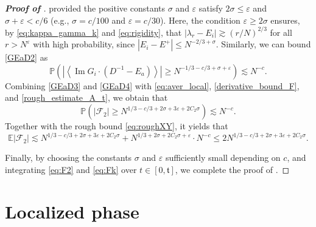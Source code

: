 \documentclass[10pt,reqno]{amsart}
\numberwithin{equation}{section}
\numberwithin{figure}{section}
\theoremstyle{plain} %
\theoremstyle{definition} %
\renewcommand{\P}{\mathbb{P}}
\newcommand{\E}{\mathbb{E}}
\newcommand{\fc}{\mathfrak c}
\newcommand{\ft}{{\mathfrak t}}
\newcommand{\pa}[1]{\left({#1}\right)}
\newcommand{\qa}[1]{\left[{#1}\right]}
\newcommand{\absa}[1]{\left\lvert #1 \right\rvert}
\newcommand{\avga}[1]{\left\langle #1 \right\rangle}
\DeclareMathOperator{\im}{\mathrm{Im}}
\newcommand{\be}{\begin{equation}}
\newcommand{\ee}{\end{equation}}
\newcommand{\e}{{\varepsilon}}
\newcommand{\OO}{\mathrm{O}}
\numberwithin{equation}{section}
\begin{document}
\begin{proof}[\bf Proof of ]
provided the positive constants $\sigma$ and $\varepsilon$ satisfy $2\sigma\le\e$ and $\sigma+\e < c/6$ (e.g., $\sigma=c/100$ and $\e=c/30$). Here, the condition $\e\ge 2\sigma$ ensures, by \eqref{eq:kappa_gamma_k} and \eqref{eq:rigidity}, that $|\lambda_r-E_i|\gtrsim (r/N)^{2/3}$ for all $r> N^{\e}$ with high probability, since $|E_i-E^+|\le N^{-2/3+\sigma}$. Similarly, we can bound \eqref{GEaD2} as %
\begin{equation}\label{GEaD4}
\P\left(\left|\avga{\im G_i\cdot\pa{D^{-1}-E_a}}\right| \ge N^{-1/3-c/3+\sigma+\e}\right)  \lesssim N^{-c} .
\end{equation}
Combining \eqref{GEaD3} and \eqref{GEaD4} with \eqref{eq:aver_local}, \eqref{derivative_bound_F}, and \eqref{rough_estimate_A_t}, we obtain that 
\[\mathbb P\left( \absa{\mathscr{F}_2}\ge N^{1/3-c/3+2\sigma+3\e+2C_2\sigma} \right)\lesssim N^{-c}.\] 
Together with the rough bound \eqref{eq:roughXY}, it yields that 
\be\label{eq:F2}
\E\absa{\mathscr{F}_2} \lesssim N^{1/3-c/3+2\sigma+3\e+2C_2\sigma} +  N^{1/3+2\sigma + 2C_2 \sigma +\varepsilon}\cdot N^{-c} \le  2N^{1/3-c/3+2\sigma+3\e+2C_2\sigma }.
\ee

Finally, by choosing the constants $\sigma$ and $\varepsilon$ sufficiently small depending on $c$, and integrating \eqref{eq:F2} and \eqref{eq:Fk} over $t\in [0, \ft]$, we complete the proof of .
\end{proof}




\section{Localized phase}\label{sec:localized_case}
\end{document}
